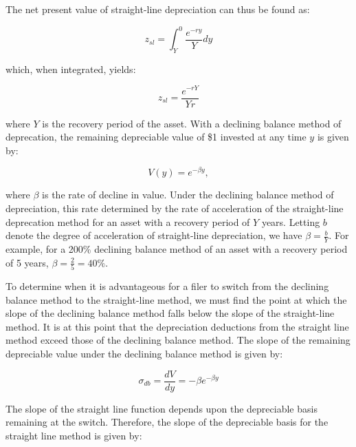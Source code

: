 \documentclass[article,11pt,letterpaper,fleqn]{article}
\theoremstyle{definition}
\numberwithin{equation}{section}
\begin{document}
The net present value of straight-line depreciation can thus be found as: 

\begin{equation}
z_{sl}=\int_{Y}^{0}\frac{e^{-ry}}{Y}dy
\end{equation}

\noindent\noindent which, when integrated, yields:

\begin{equation}
z_{sl}=\frac{e^{-rY}}{Yr}
\end{equation}

\noindent\noindent where $Y$ is the recovery period of the asset.  With a declining balance method of deprecation, the remaining depreciable value of \$1 invested at any time $y$ is given by:

\begin{equation}
V(y) =  e^{-\beta y}, 
\end{equation}

\noindent\noindent where $\beta$ is the rate of decline in value.  Under the declining balance method of depreciation, this rate determined by the rate of acceleration of the straight-line deprecation method for an asset with a recovery period of $Y$ years.  Letting $b$ denote the degree of acceleration of straight-line depreciation, we have $\beta=\frac{b}{Y}$.  For example, for a 200\% declining balance method of an asset with a recovery period of 5 years, $\beta =\frac{2}{5}=40\%$.

To determine when it is advantageous for a filer to switch from the declining balance method to the straight-line method, we must find the point at which the slope of the declining balance method falls below the slope of the straight-line method.  It is at this point that the depreciation deductions from the straight line method exceed those of the declining balance method.  The slope of the remaining depreciable value under the declining balance method is given by:


\begin{equation}
\sigma_{db} = \frac{dV}{dy}=-\beta e^{-\beta y}
\end{equation}

\noindent\noindent The slope of the straight line function depends upon the depreciable basis remaining at the switch.  Therefore, the slope of the depreciable basis for the straight line method is given by:
\end{document}
